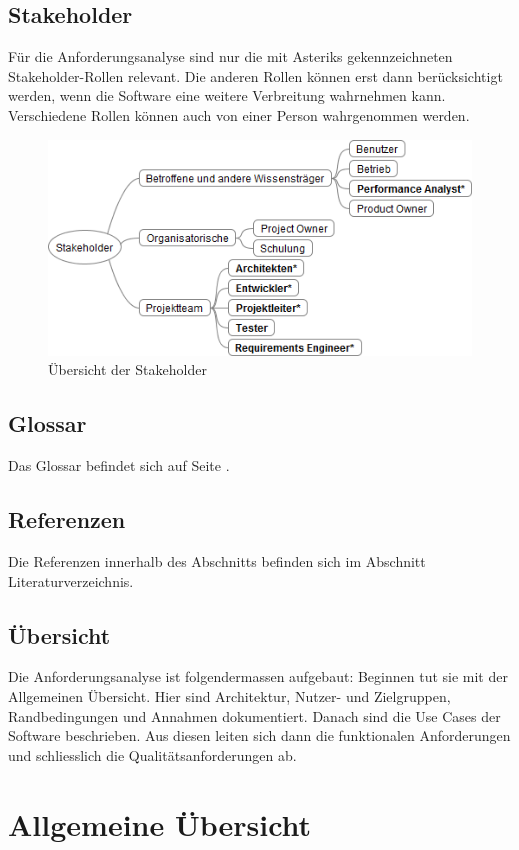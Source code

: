 \subsection{Stakeholder}
Für die Anforderungsanalyse sind nur die mit Asteriks gekennzeichneten Stakeholder-Rollen relevant. Die anderen Rollen können erst dann berücksichtigt werden, wenn die Software eine weitere Verbreitung wahrnehmen kann. Verschiedene Rollen können auch von einer Person wahrgenommen werden. 
\begin{figure}[H]
        	\caption{Übersicht der Stakeholder}
  	\centering
    	\includegraphics[width=13cm]{images/stakeholder_analyse}
\end{figure}

\subsection{Glossar}
Das Glossar befindet sich auf Seite \pageref{glossar}. 
\subsection{Referenzen}
Die Referenzen innerhalb des Abschnitts  befinden sich im Abschnitt Literaturverzeichnis.
\subsection{Übersicht}
Die Anforderungsanalyse ist folgendermassen aufgebaut: Beginnen tut sie mit der Allgemeinen Übersicht. Hier sind Architektur, Nutzer- und Zielgruppen, Randbedingungen und Annahmen dokumentiert. Danach sind die Use Cases der Software beschrieben. Aus diesen leiten sich dann die funktionalen Anforderungen und schliesslich die Qualitätsanforderungen ab.
\section{Allgemeine Übersicht}\label{allgemeine_uebersicht}
